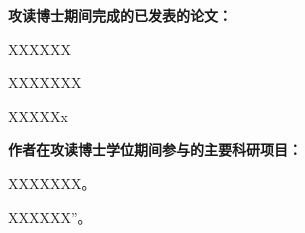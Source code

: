 \ifx\atempxetex\usewhat
\fi
{}
{}

\song\sihao\sf\bf{攻读博士期间完成的已发表的论文：}
\vspace{10pt}
\begin{publist}

\xiaosi \item XXXXXX

\vspace{10pt}
\item XXXXXXX


\vspace{10pt}
\item XXXXXx





\end{publist}



\vspace{100pt}
\song\sihao\sf\bf{作者在攻读博士学位期间参与的主要科研项目：}
\vspace{10pt}
\begin{publist}
\xiaosi \item XXXXXXX。
 \vspace{10pt}
 \item XXXXXX”。
\end{publist}
